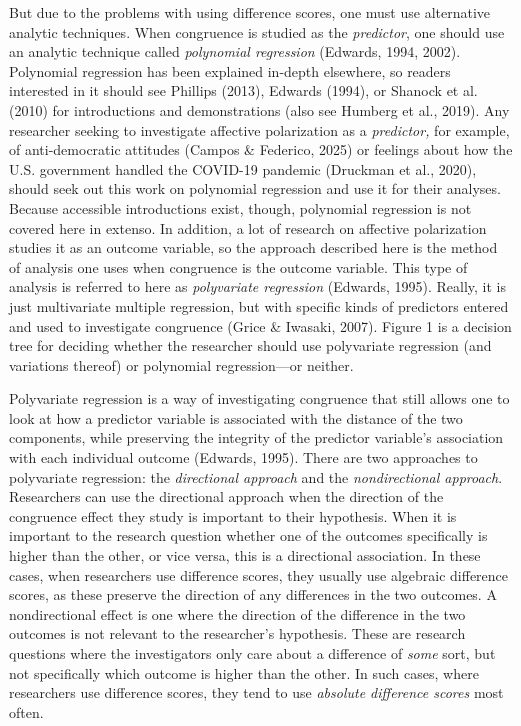 \documentclass[authordate, meta, issue]{jote-new-article}
\begin{document}
	But due to the problems with using difference scores, one must use alternative analytic techniques. When congruence is studied as the \emph{predictor}, one should use an analytic technique called \emph{polynomial regression} (Edwards, 1994, 2002). Polynomial regression has been explained in-depth elsewhere, so readers interested in it should see Phillips (2013), Edwards (1994), or Shanock et al. (2010) for introductions and demonstrations (also see Humberg et al., 2019). Any researcher seeking to investigate affective polarization as a \emph{predictor, }for example, of anti-democratic attitudes (Campos \& Federico, 2025) or feelings about how the U.S. government handled the COVID-19 pandemic (Druckman et al., 2020), should seek out this work on polynomial regression and use it for their analyses. Because accessible introductions exist, though, polynomial regression is not covered here in extenso. In addition, a lot of research on affective polarization studies it as an outcome variable, so the approach described here is the method of analysis one uses when congruence is the outcome variable. This type of analysis is referred to here as \emph{polyvariate regression }(Edwards, 1995). Really, it is just multivariate multiple regression, but with specific kinds of predictors entered and used to investigate congruence (Grice \& Iwasaki, 2007). Figure 1 is a decision tree for deciding whether the researcher should use polyvariate regression (and variations thereof) or polynomial regression—or neither.



	Polyvariate regression is a way of investigating congruence that still allows one to look at how a predictor variable is associated with the distance of the two components, while preserving the integrity of the predictor variable's association with each individual outcome (Edwards, 1995). There are two approaches to polyvariate regression: the \emph{directional approach} and the \emph{nondirectional approach}. Researchers can use the directional approach when the direction of the congruence effect they study is important to their hypothesis. When it is important to the research question whether one of the outcomes specifically is higher than the other, or vice versa, this is a directional association. In these cases, when researchers use difference scores, they usually use algebraic difference scores, as these preserve the direction of any differences in the two outcomes. A nondirectional effect is one where the direction of the difference in the two outcomes is not relevant to the researcher's hypothesis. These are research questions where the investigators only care about a difference of \emph{some }sort, but not specifically which outcome is higher than the other. In such cases, where researchers use difference scores, they tend to use \emph{absolute difference scores} most often.
\end{document}
